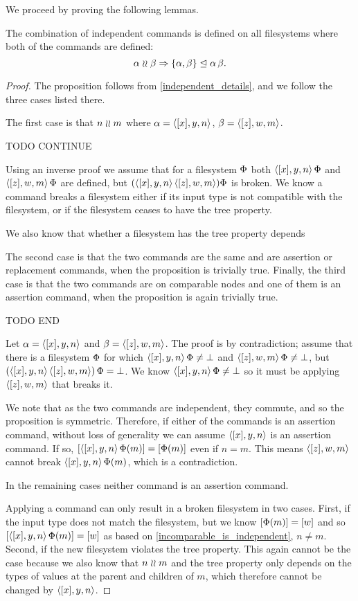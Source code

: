 We proceed by proving the following lemmas.

\begin{mylem}
The combination of independent commands is defined on all filesystems
where both of the commands are defined:
\[ \alpha\mathrel{\wr\wr} \beta \Rightarrow {\{{\alpha, \beta}\}}\trianglelefteq{\alpha\,\beta}. \]
\end{mylem}
\begin{proof}
The proposition follows from \cref{independent_details},
and we follow the three cases listed there.

The first case is that $n\mathrel{\wr\wr} m$ where $\alpha=\langle{[x],y,n}\rangle$, $\beta=\langle{[z],w,m}\rangle$.

TODO CONTINUE

Using an inverse proof we assume that for a filesystem $\Phi$
both $\langle{[x],y,n}\rangle\,\Phi$ and $\langle{[z],w,m}\rangle\,\Phi$ are defined, but $(\langle{[x],y,n}\rangle\,\langle{[z],w,m}\rangle)\Phi$ is broken.
We know a command breaks a filesystem either if
its input type is not compatible with the filesystem,
or if the filesystem ceases to have the tree property.

We also know that whether a filesystem has the tree property
depends 

The second case is that the two commands are the same and are assertion or replacement
commands, when the proposition is trivially true.
Finally, the third case is that the two commands are on comparable nodes and one of them
is an assertion command, when the proposition is again trivially true.

TODO END

Let $\alpha=\langle{[x],y,n}\rangle$ and $\beta=\langle{[z],w,m}\rangle$.
The proof is by contradiction;
assume that there is a filesystem $\Phi$ for which
$\langle{[x],y,n}\rangle\,\Phi\neq\bot$ and $\langle{[z],w,m}\rangle\,\Phi\neq\bot$, but
$(\langle{[x],y,n}\rangle\, \langle{[z],w,m}\rangle)\,\Phi=\bot$.
We know $\langle{[x],y,n}\rangle\,\Phi\neq\bot$ so it must be applying 
$\langle{[z],w,m}\rangle$ that breaks it.

We note that as the two commands are independent, they commute, and so
the proposition is symmetric.
Therefore, if either of the commands is an assertion command,
without loss of generality we can assume $\langle{[x],y,n}\rangle$ is an assertion command.
If so, 
$[\langle{[x],y,n}\rangle\,\Phi(m)]=[\Phi(m)]$ even if $n=m$.
This means $\langle{[z],w,m}\rangle$ cannot break $\langle{[x],y,n}\rangle\,\Phi(m)$, which is a contradiction.

In the remaining cases neither command is an assertion command.

Applying a command can only result in a broken filesystem in two cases.
First, if the input type does not match the filesystem,
but we know $[\Phi(m)]=[w]$ and so
$[\langle{[x],y,n}\rangle\,\Phi(m)]=[w]$ as based on \cref{incomparable_is_independent}, $n\neq m$.
Second, if the new filesystem violates the tree property.
This again cannot be the case because we also know that $n\mathrel{\wr\wr} m$
and the tree property only depends on the types of values at the parent and children of $m$,
which therefore cannot be changed by $\langle{[x],y,n}\rangle$.
\end{proof}

